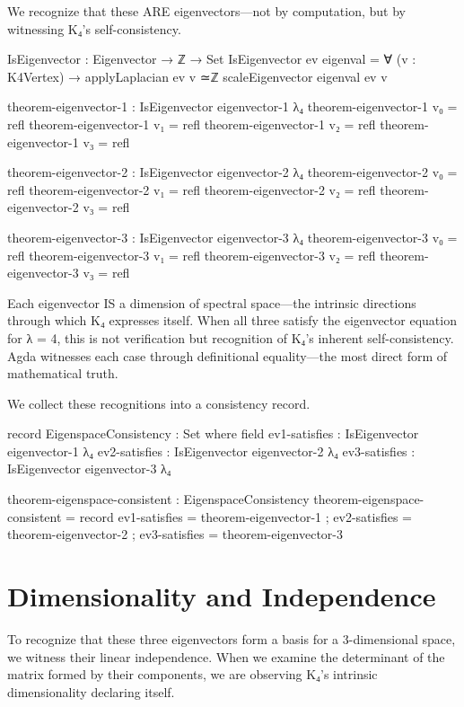 \documentclass[11pt,a4paper]{book}
\begin{document}
We recognize that these ARE eigenvectors—not by computation, but by witnessing K₄'s self-consistency.

\begin{code}
IsEigenvector : Eigenvector → ℤ → Set
IsEigenvector ev eigenval = ∀ (v : K4Vertex) → 
  applyLaplacian ev v ≃ℤ scaleEigenvector eigenval ev v

theorem-eigenvector-1 : IsEigenvector eigenvector-1 λ₄
theorem-eigenvector-1 v₀ = refl
theorem-eigenvector-1 v₁ = refl
theorem-eigenvector-1 v₂ = refl
theorem-eigenvector-1 v₃ = refl

theorem-eigenvector-2 : IsEigenvector eigenvector-2 λ₄
theorem-eigenvector-2 v₀ = refl
theorem-eigenvector-2 v₁ = refl
theorem-eigenvector-2 v₂ = refl
theorem-eigenvector-2 v₃ = refl

theorem-eigenvector-3 : IsEigenvector eigenvector-3 λ₄
theorem-eigenvector-3 v₀ = refl
theorem-eigenvector-3 v₁ = refl
theorem-eigenvector-3 v₂ = refl
theorem-eigenvector-3 v₃ = refl
\end{code}

Each eigenvector IS a dimension of spectral space—the intrinsic directions through which K₄ expresses itself. When all three satisfy the eigenvector equation for λ = 4, this is not verification but recognition of K₄'s inherent self-consistency. Agda witnesses each case through definitional equality—the most direct form of mathematical truth.

We collect these recognitions into a consistency record.

\begin{code}
record EigenspaceConsistency : Set where
  field
    ev1-satisfies : IsEigenvector eigenvector-1 λ₄
    ev2-satisfies : IsEigenvector eigenvector-2 λ₄
    ev3-satisfies : IsEigenvector eigenvector-3 λ₄

theorem-eigenspace-consistent : EigenspaceConsistency
theorem-eigenspace-consistent = record
  { ev1-satisfies = theorem-eigenvector-1
  ; ev2-satisfies = theorem-eigenvector-2
  ; ev3-satisfies = theorem-eigenvector-3
  }
\end{code}

\section{Dimensionality and Independence}

To recognize that these three eigenvectors form a basis for a 3-dimensional space, we witness their linear independence. When we examine the determinant of the matrix formed by their components, we are observing K₄'s intrinsic dimensionality declaring itself.
\end{document}
